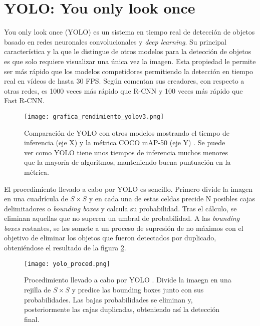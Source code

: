 \section{YOLO: You only look once}

You only look once (YOLO) es un sistema en tiempo real de detección de objetos basado en redes neuronales convolucionales y \textit{deep learning}. Su principal característica y la que le distingue de otros modelos para la detección de objetos es que solo requiere visualizar una única vez la imagen. Esta propiedad le permite ser más rápido que los modelos competidores permitiendo la detección en tiempo real en vídeos de hasta 30 FPS. Según comentan sus creadores, con respecto a otras redes, es 1000 veces más rápido que R-CNN y 100 veces más rápido que Fast R-CNN.  \cite{yolo} \\

\begin{figure}[H]
	\begin{center} 
		\texttt{[image: grafica\_rendimiento\_yolov3.png]}
	\end{center}
	\caption{Comparación de YOLO con otros modelos mostrando el tiempo de inferencia (eje X) y la métrica COCO mAP-50 (eje Y) \cite{yolo}. Se puede ver como YOLO tiene unos tiempos de inferencia muchos menores que la mayoría de algoritmos, manteniendo buena puntuación en la métrica.}
	\label{fig:rend}
\end{figure}

El procedimiento llevado a cabo por YOLO es sencillo. Primero divide la imagen en una cuadrícula de $S \times S$ y en cada una de estas celdas precide N posibles cajas delimitadores o \textit{bounding boxes} y calcula su probabilidad. Tras el cálculo, se eliminan aquellas que no superen un umbral de probabilidad. A las \textit{bounding boxes} restantes, se les somete a un proceso de supresión de no máximos con el objetivo de eliminar los objetos que fueron detectados por duplicado, obteniéndose el resultado de la figura \ref{fig:proced}.\\

\begin{figure}[h]
	\begin{center} 
		\texttt{[image: yolo\_proced.png]}
	\end{center}
	\caption{Procedimiento llevado a cabo por YOLO \cite{yolo}. Divide la imaegn en una rejilla de $S \times S$ y predice las bounding boxes junto con sus probabilidades. Las bajas probabilidades se eliminan y, posteriormente las cajas duplicadas, obteniendo así la detección final.}
	\label{fig:proced}
\end{figure}

